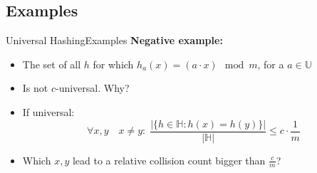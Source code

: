\subsection{Examples}

\begin{frame}{Universal Hashing}{Examples}
  \textbf{Negative example:}
  \begin{itemize}
    \item<2->
      The set of all {\color{Mittel-Blau}$h$} for which {\color{Mittel-Blau}$h_a(x) = (a \cdot x) \mod m$, for a $a \in \mathbb{U}$}
    \item<3->
      Is not {\color{Mittel-Blau}$c$}-universal. Why?
    \item<4->
      If universal:
       {\color{Mittel-Blau}
      \begin{displaymath}
        \forall x, y \hspace{1em} x \neq y\!: \; \frac{
          \vert \{h \in \mathbb{H}: h(x) = h(y)\} \vert
        }{
          \vert \mathbb{H} \vert
        } \leq c \cdot \frac{1}{m}
       \end{displaymath}}
    \vspace{-1em}
    \item<5->
      Which {\color{Mittel-Blau}$x, y$} lead to a relative collision count bigger than {\color{Mittel-Blau}$\frac{c}{m}$}?
  \end{itemize}
\end{frame}


